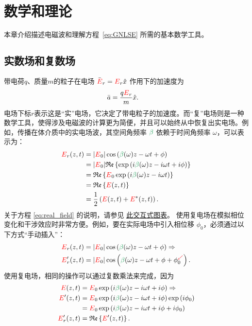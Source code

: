 \chapter{数学和理论}
\label{ch:MathAndTheory}

本章介绍描述电磁波和理解方程~\ref{eq:GNLSE} 所需的基本数学工具。

\section{实数场和复数场}
带电荷$q$、质量$m$的粒子在电场 $\Bar{\textcolor{red}{E}}_r = \textcolor{red}{E}_r \hat{x}$ 作用下的加速度为
\begin{align}
    \Bar{a} &=  \frac{q\textcolor{red}{E}_r}{m}\hat{x}.
\end{align}
电场下标$r$表示这是“实”电场，它决定了带电粒子的加速度。而“复”电场则是一种数学工具，使得涉及电磁波的计算更为简便，并且可以始终从中恢复出实电场。例如，传播在体介质中的实电场波，其空间角频率 $\betag$ 依赖于时间角频率 $\omega$，可以表示为：\begin{align}
\label{eq:real_field}
    \E_r(z,t) &= |\E_0|\cos\left(\betag(\omega)z-\omega t+\phi\right) \\\nonumber 
     &=|\E_0| \real\left\{  \exp\left( i\betag(\omega)z-i\omega t+i\phi \right) \right\} \\ \nonumber 
     &= \real\left\{ \E_0 \exp\left( i\betag(\omega)z-i\omega t\right) \right\}  \\ \nonumber
     &= \real\left\{ \E(z,t) \right\}  \\ \nonumber
     &=  \frac{1}{2}\left( \E(z,t) + \E^*(z,t) \right).   
\end{align}
关于方程 \ref{eq:real_field} 的说明，请参见 \href{https://www.desmos.com/calculator/fgvozursrl}{此交互式图表}。
使用复电场在模拟相位变化和干涉效应时非常方便。例如，要在实际电场中引入相位移 $\phi_0$，必须通过以下方式“手动插入”：\begin{align}
\label{eq:insert_phase}
    \E_r(z,t) &= |\E_0|\cos\left(\betag(\omega)z-\omega t+\phi\right) \Rightarrow \\ \nonumber \E_r'(z,t) &= |\E_0|\cos\left(\betag(\omega)z-\omega t+\phi+\phi_0^{\textcolor{Red}{\swarrow}}\right).   
\end{align}
使用复电场，相同的操作可以通过复数乘法来完成，因为
\begin{align}
\label{eq:insert_phase_complex}
    \E(z,t) &=\E_0 \exp\left( i\betag(\omega)z-i\omega t+ i\phi\right)\Rightarrow \\ \nonumber \E'(z,t) &=  \E_0 \exp\left( i\betag(\omega)z-i\omega t +i\phi\right)\exp\left( i\phi_0\right) \\ \nonumber
    &=\E_0 \exp\left( i\betag(\omega)z-i\omega t +i\phi+ i\phi_0\right) \\ \nonumber
    \E_r'(z,t) &= \real\left\{  \E'(z,t)   \right\}. 
\end{align}

